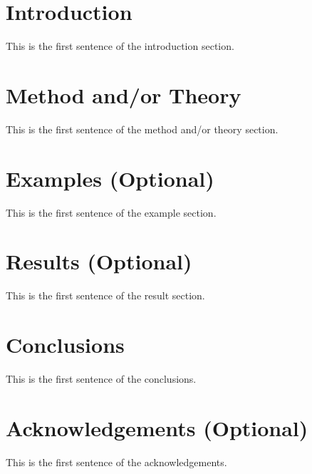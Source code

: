 \documentclass{paris17}
\begin{document}
\section{Introduction}

This is the first sentence of the introduction section.

\section{Method and/or Theory}

This is the first sentence of the method and/or theory section.

\section{Examples (Optional)}

This is the first sentence of the example section.

\section{Results (Optional)}

This is the first sentence of the result section.


\section{Conclusions}

This is the first sentence of the conclusions.

\section{Acknowledgements (Optional)}

This is the first sentence of the acknowledgements.

% 
\end{document}
